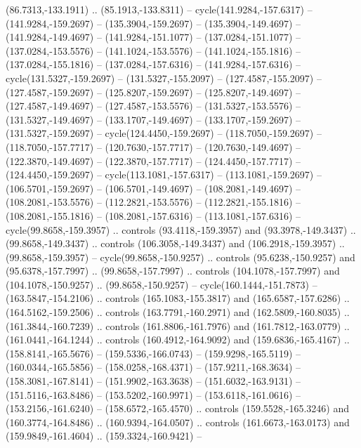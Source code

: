 \begin{scope}[cm={{1.25,0.0,0.0,-1.25,(0.0,442.91375)}}]
\begin{scope}[xscale=1.000,yscale=-1.000,fill=c545457,line join=miter,line cap=butt,line width=0.800pt]
      (86.7313,-133.1911) .. (85.1913,-133.8311) -- cycle(141.9284,-157.6317) --
      (141.9284,-159.2697) -- (135.3904,-159.2697) -- (135.3904,-149.4697) --
      (141.9284,-149.4697) -- (141.9284,-151.1077) -- (137.0284,-151.1077) --
      (137.0284,-153.5576) -- (141.1024,-153.5576) -- (141.1024,-155.1816) --
      (137.0284,-155.1816) -- (137.0284,-157.6316) -- (141.9284,-157.6316) --
      cycle(131.5327,-159.2697) -- (131.5327,-155.2097) -- (127.4587,-155.2097) --
      (127.4587,-159.2697) -- (125.8207,-159.2697) -- (125.8207,-149.4697) --
      (127.4587,-149.4697) -- (127.4587,-153.5576) -- (131.5327,-153.5576) --
      (131.5327,-149.4697) -- (133.1707,-149.4697) -- (133.1707,-159.2697) --
      (131.5327,-159.2697) -- cycle(124.4450,-159.2697) -- (118.7050,-159.2697) --
      (118.7050,-157.7717) -- (120.7630,-157.7717) -- (120.7630,-149.4697) --
      (122.3870,-149.4697) -- (122.3870,-157.7717) -- (124.4450,-157.7717) --
      (124.4450,-159.2697) -- cycle(113.1081,-157.6317) -- (113.1081,-159.2697) --
      (106.5701,-159.2697) -- (106.5701,-149.4697) -- (108.2081,-149.4697) --
      (108.2081,-153.5576) -- (112.2821,-153.5576) -- (112.2821,-155.1816) --
      (108.2081,-155.1816) -- (108.2081,-157.6316) -- (113.1081,-157.6316) --
      cycle(99.8658,-159.3957) .. controls (93.4118,-159.3957) and
      (93.3978,-149.3437) .. (99.8658,-149.3437) .. controls (106.3058,-149.3437)
      and (106.2918,-159.3957) .. (99.8658,-159.3957) -- cycle(99.8658,-150.9257) ..
      controls (95.6238,-150.9257) and (95.6378,-157.7997) .. (99.8658,-157.7997) ..
      controls (104.1078,-157.7997) and (104.1078,-150.9257) .. (99.8658,-150.9257)
      -- cycle(160.1444,-151.7873) -- (163.5847,-154.2106) .. controls
      (165.1083,-155.3817) and (165.6587,-157.6286) .. (164.5162,-159.2506) ..
      controls (163.7791,-160.2971) and (162.5809,-160.8035) .. (161.3844,-160.7239)
      .. controls (161.8806,-161.7976) and (161.7812,-163.0779) ..
      (161.0441,-164.1244) .. controls (160.4912,-164.9092) and (159.6836,-165.4167)
      .. (158.8141,-165.5676) -- (159.5336,-166.0743) -- (159.9298,-165.5119) --
      (160.0344,-165.5856) -- (158.0258,-168.4371) -- (157.9211,-168.3634) --
      (158.3081,-167.8141) -- (151.9902,-163.3638) -- (151.6032,-163.9131) --
      (151.5116,-163.8486) -- (153.5202,-160.9971) -- (153.6118,-161.0616) --
      (153.2156,-161.6240) -- (158.6572,-165.4570) .. controls (159.5528,-165.3246)
      and (160.3774,-164.8486) .. (160.9394,-164.0507) .. controls
      (161.6673,-163.0173) and (159.9849,-161.4604) .. (159.3324,-160.9421) --

\end{scope}
\end{scope}

